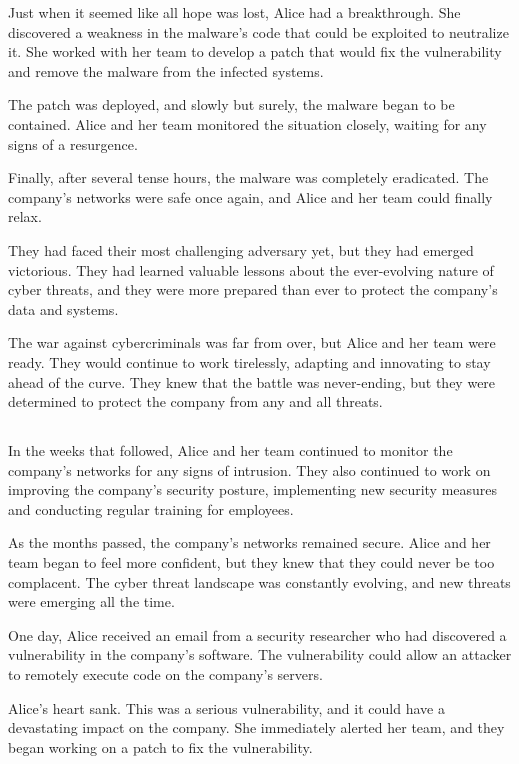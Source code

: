 \documentclass{./StyCls/MyArticle}
\begin{document}
Just when it seemed like all hope was lost, Alice had a breakthrough. She discovered a weakness in the malware's code that could be exploited to neutralize it. She worked with her team to develop a patch that would fix the vulnerability and remove the malware from the infected systems.

The patch was deployed, and slowly but surely, the malware began to be contained. Alice and her team monitored the situation closely, waiting for any signs of a resurgence.

Finally, after several tense hours, the malware was completely eradicated. The company's networks were safe once again, and Alice and her team could finally relax.

They had faced their most challenging adversary yet, but they had emerged victorious. They had learned valuable lessons about the ever-evolving nature of cyber threats, and they were more prepared than ever to protect the company's data and systems.

The war against cybercriminals was far from over, but Alice and her team were ready. They would continue to work tirelessly, adapting and innovating to stay ahead of the curve. They knew that the battle was never-ending, but they were determined to protect the company from any and all threats.


\subsection{}


In the weeks that followed, Alice and her team continued to monitor the company's networks for any signs of intrusion. They also continued to work on improving the company's security posture, implementing new security measures and conducting regular training for employees.

As the months passed, the company's networks remained secure. Alice and her team began to feel more confident, but they knew that they could never be too complacent. The cyber threat landscape was constantly evolving, and new threats were emerging all the time.

One day, Alice received an email from a security researcher who had discovered a vulnerability in the company's software. The vulnerability could allow an attacker to remotely execute code on the company's servers.

Alice's heart sank. This was a serious vulnerability, and it could have a devastating impact on the company. She immediately alerted her team, and they began working on a patch to fix the vulnerability.
\end{document}
